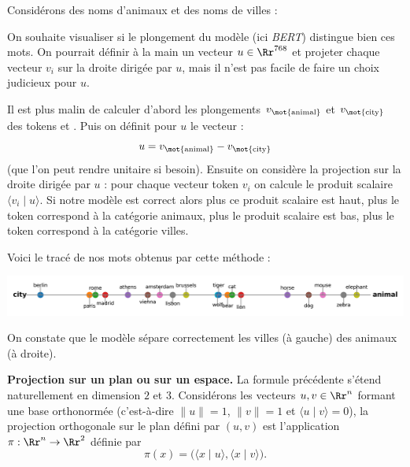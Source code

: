 \documentclass[11pt,class=report,crop=false]{standalone}
\begin{document}
\begin{exemple}
Considérons des noms d'animaux et des noms de villes :

On souhaite visualiser si le plongement du modèle (ici \emph{BERT}) distingue bien ces mots.
On pourrait définir à la main un vecteur $u \in \Rr^{768}$ et projeter chaque vecteur $v_i$ sur la droite dirigée par $u$, mais il n'est pas facile de faire un choix judicieux pour $u$.

Il est plus malin de calculer d'abord les plongements $v_{\text{\mot{animal}}}$ et 
$v_{\text{\mot{city}}}$ des tokens  et . Puis on définit pour $u$ le vecteur :
	$$u = v_{\text{\mot{animal}}} - v_{\text{\mot{city}}}$$
(que l'on peut rendre unitaire si besoin).
Ensuite on considère la projection sur la droite dirigée par $u$ :
pour chaque vecteur token $v_i$ on calcule le produit scalaire $\langle v_i \mid u \rangle$. Si notre modèle est correct alors plus ce produit scalaire est haut, plus le token correspond à la catégorie \og{}animaux\fg{}, plus le produit scalaire est bas, plus le token correspond à la catégorie \og{}villes\fg{}.

Voici le tracé de nos mots obtenus par cette méthode :

\begin{center}
	\includegraphics[scale=\myscale,scale=0.63]{figures/projection-droite}
\end{center}

On constate que le modèle sépare correctement les villes (à gauche) des animaux (à droite).
\end{exemple}


\bigskip

\textbf{Projection sur un plan ou sur un espace.}
La formule précédente s'étend naturellement en dimension $2$ et $3$.
Considérons les vecteurs $u,v \in \Rr^n$ formant une base orthonormée (c'est-à-dire $\|u\| = 1$, $\|v\| = 1$ et $\langle u \mid v \rangle =0$), la projection orthogonale sur le plan défini par $(u,v)$ est l'application $\pi : \Rr^n \to \Rr^2$ définie par 
$$\pi(x) = \big(\langle x \mid u \rangle, \langle x \mid v \rangle\big).$$
\end{document}
